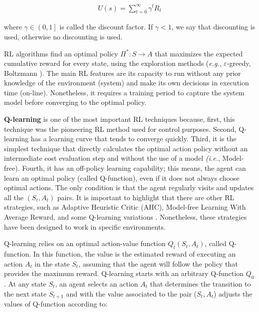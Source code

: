 \begin{equation}
    \begin{split}
        U\left ( s \right ) = \sum_{t=0}^{\infty} \gamma^{t}R_{t}
    \end{split}
\end{equation}

where $\gamma \in \left ( 0,1 \right ]$ is called the discount factor. If $\gamma < 1$, we say that discounting is used, otherwise no discounting is used. 

RL algorithms find an optimal policy $ \Pi^{*}: S \rightarrow A $ that maximizes the expected cumulative reward for every state, using the exploration methods (\textit{e.g.}, $\varepsilon$-greedy, Boltzmann \cite{sutton_1998:rl} \cite{teng_2012:exploration}). The main RL features are its capacity to run without any prior knowledge of the environment (system) and make its own decisions in execution time (on-line). Nonetheless, it requires a training period to capture the system model before converging to the optimal policy.

\textbf{Q-learning} is one of the most important RL techniques \cite{duryea_2016:exploring_qlearning} because, first, this technique was the pioneering RL method used for control purposes. Second, Q-learning has a learning curve that tends to converge quickly. Third, it is the simplest technique that directly calculates the optimal action policy without an intermediate cost evaluation step and without the use of a model \textit{(i.e.}, Model-free). Fourth, it has an off-policy learning capability; this means, the agent can learn an optimal policy (called Q-function), even if it does not always choose optimal actions. The only condition is that the agent regularly visits and updates all the $(S_t, A_t)$ pairs. It is important to highlight that there are other RL strategies, such as Adaptive Heuristic Critic (AHC), Model-free Learning With Average Reward, and some Q-learning variations \cite{manju_2011:analysis_ql} \cite{kaelbling_1996:reinforcement}. Nonetheless, these strategies have been designed to work in specific environments.

Q-learning \cite{Watkins:1989:q_learning} \cite{farahnakian_2011:q-learning} relies on an optimal action-value function $ Q_{t}(S_t,A_t)$, called Q-function. In this function, the value is the estimated reward of executing an action $A_t$ in the state $S_t$, assuming that the agent will follow the policy that provides the maximum reward. Q-learning starts with an arbitrary Q-function $Q_{0}$. At any state $S_{t}$, an agent selects an action $A_{t}$ that determines the transition to the next state $S_{t+1}$ and with the value associated to the pair ($S_t,A_t$) adjusts the values of Q-function according to:

